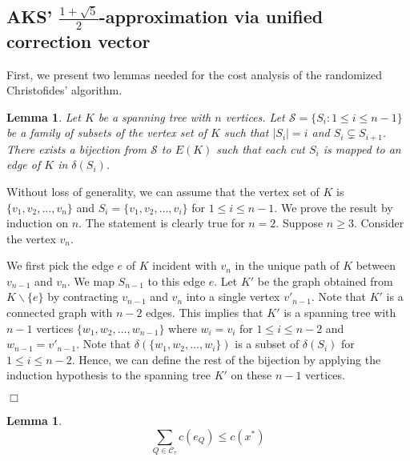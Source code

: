 \documentclass[11pt]{article}
\newcommand{\qed}{\hspace*{\fill}$\Box$}
\newcommand{\bs}{\backslash}
\newtheorem{lemma}[theorem]{Lemma}
\newenvironment{proof}[1][Proof. ]{\noindent {\bf #1 }}{\qed}
\begin{document}
\subsection{AKS' $\frac{1+\sqrt{5}}{2}$-approximation via
unified correction vector} \label{sec:AKS'results}

First, we present two lemmas needed for the cost analysis of the randomized Christofides' algorithm.
\begin{lemma}\label{base_inj}
Let $K$ be a spanning tree with $n$ vertices. Let $\mathcal{S}=\{S_i:1\leq i\leq n-1\}$ be a family of subsets
of the vertex set of $K$ such that
$|S_i|=i$ and $S_i\subsetneq S_{i+1}$. There exists a bijection from $\mathcal{S}$ to $E(K)$ such that
each cut $S_i$ is mapped to an edge of $K$ in $\delta(S_i)$.
\end{lemma}

\begin{proof}Without loss of generality, we can assume that the vertex set of $K$ is $\{v_1, v_2, \ldots, v_n\}$
and $S_i=\{v_1, v_2, \ldots, v_i\}$ for $1\leq i\leq n-1$. We prove the result by induction on $n$.
The statement is clearly true for $n=2$.
Suppose $n\geq 3$.
Consider the vertex $v_n$.

We first pick the edge $e$ of $K$ incident with $v_n$
in the unique path of $K$ between $v_{n-1}$ and $v_n$. We map $S_{n-1}$ to this edge $e$. Let $K'$ be the graph obtained from $K\bs\{e\}$ by
contracting $v_{n-1}$ and $v_n$ into a single vertex $v'_{n-1}$. Note that $K'$ is a connected graph with $n-2$ edges. This implies
that $K'$ is a spanning tree with $n-1$ vertices $\{w_1, w_2, \ldots, w_{n-1}\}$ where $w_i=v_i$ for $1\leq i\leq n-2$ and $w_{n-1}=v'_{n-1}$.
Note that $\delta(\{w_1, w_2, \ldots, w_i\})$ is a subset of $\delta(S_i)$ for $1\leq i\leq n-2$. Hence, we can define
the rest of the bijection by applying the induction hypothesis
to the spanning tree $K'$ on these $n-1$ vertices.











\end{proof}


\begin{lemma}\label{lem:ineq1}
\begin{equation} \label{ineq1}
\sum_{Q\in \mathcal{C}_\tau} c(e_Q) \leq c(x^*)
\end{equation}
\end{lemma}
\end{document}
